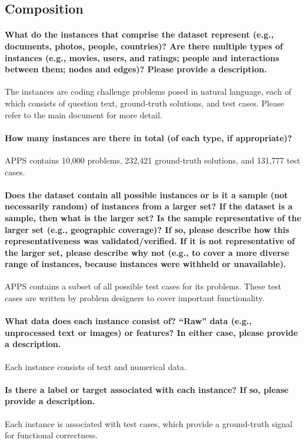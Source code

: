 \subsection{Composition}
\paragraph{What do the instances that comprise the dataset represent (e.g.,
documents, photos, people, countries)? Are there multiple types of
instances (e.g., movies, users, and ratings; people and interactions between them; nodes and edges)? Please provide a description.}
The instances are coding challenge problems posed in natural language, each of which consists of question text, ground-truth solutions, and test cases. Please refer to the main document for more detail.

\paragraph{How many instances are there in total (of each type, if appropriate)?}
APPS contains 10,000 problems, 232,421 ground-truth solutions, and 131,777 test cases.

\paragraph{Does the dataset contain all possible instances or is it a sample
(not necessarily random) of instances from a larger set? If the
dataset is a sample, then what is the larger set? Is the sample representative of the larger set (e.g., geographic coverage)? If so, please describe how
this representativeness was validated/verified. If it is not representative
of the larger set, please describe why not (e.g., to cover a more diverse
range of instances, because instances were withheld or unavailable).}
APPS contains a subset of all possible test cases for its problems. These test cases are written by problem designers to cover important functionality.

\paragraph{What data does each instance consist of? “Raw” data (e.g., unprocessed text or images) or features? In either case, please provide a description.}
Each instance consists of text and numerical data.

\paragraph{Is there a label or target associated with each instance? If so, please
provide a description.}
Each instance is associated with test cases, which provide a ground-truth signal for functional correctness.


